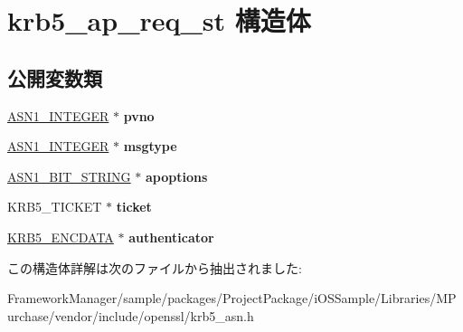 \hypertarget{structkrb5__ap__req__st}{}\section{krb5\+\_\+ap\+\_\+req\+\_\+st 構造体}
\label{structkrb5__ap__req__st}
\subsection*{公開変数類}
\begin{DoxyCompactItemize}
\item 
\hypertarget{structkrb5__ap__req__st_ad7f61cf7b1d536b06dde3c71776c118f}{}\hyperlink{structasn1__string__st}{A\+S\+N1\+\_\+\+I\+N\+T\+E\+G\+E\+R} $\ast$ {\bfseries pvno}\label{structkrb5__ap__req__st_ad7f61cf7b1d536b06dde3c71776c118f}

\item 
\hypertarget{structkrb5__ap__req__st_a95993daaa70c2d6dc49746ea6867f790}{}\hyperlink{structasn1__string__st}{A\+S\+N1\+\_\+\+I\+N\+T\+E\+G\+E\+R} $\ast$ {\bfseries msgtype}\label{structkrb5__ap__req__st_a95993daaa70c2d6dc49746ea6867f790}

\item 
\hypertarget{structkrb5__ap__req__st_ae43d1ed55bdd32998d4fab8918f62d6b}{}\hyperlink{structasn1__string__st}{A\+S\+N1\+\_\+\+B\+I\+T\+\_\+\+S\+T\+R\+I\+N\+G} $\ast$ {\bfseries apoptions}\label{structkrb5__ap__req__st_ae43d1ed55bdd32998d4fab8918f62d6b}

\item 
\hypertarget{structkrb5__ap__req__st_a9f842653f3c353af99fdd723151d26a4}{}K\+R\+B5\+\_\+\+T\+I\+C\+K\+E\+T $\ast$ {\bfseries ticket}\label{structkrb5__ap__req__st_a9f842653f3c353af99fdd723151d26a4}

\item 
\hypertarget{structkrb5__ap__req__st_aa3f69c831c3e59add2c118ce00b974e9}{}\hyperlink{structkrb5__encdata__st}{K\+R\+B5\+\_\+\+E\+N\+C\+D\+A\+T\+A} $\ast$ {\bfseries authenticator}\label{structkrb5__ap__req__st_aa3f69c831c3e59add2c118ce00b974e9}

\end{DoxyCompactItemize}


この構造体詳解は次のファイルから抽出されました\+:\begin{DoxyCompactItemize}
\item 
Framework\+Manager/sample/packages/\+Project\+Package/i\+O\+S\+Sample/\+Libraries/\+M\+Purchase/vendor/include/openssl/krb5\+\_\+asn.\+h\end{DoxyCompactItemize}
